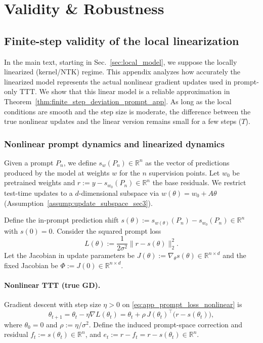 \documentclass{article}
\theoremstyle{plain}
\theoremstyle{definition}
\theoremstyle{remark}
\begin{document}
\section{Validity \& Robustness}

\subsection{Finite-step validity of the local linearization}
\label{app:linearization_error}

In the main text, starting in Sec.~\ref{sec:local_model}, we suppose the locally linearized (kernel/NTK) regime. This appendix analyzes how accurately the linearized model represents the actual nonlinear gradient updates used in prompt-only TTT. We show that this linear model is a reliable approximation in Theorem~\ref{thm:finite_step_deviation_prompt_app}. As long as the local conditions are smooth and the step size is moderate, the difference between the true nonlinear updates and the linear version remains small for a few steps ($T$).

\subsubsection{Nonlinear prompt dynamics and linearized dynamics}
\label{app:nonlinear_vs_linear}

Given a prompt $P_n$, we define $s_w(P_n) \in \mathbb{R}^n$ as the vector of predictions produced by the model at weights $w$ for the $n$ supervision points.
Let $w_0$ be pretrained weights and $r:=y-s_{w_0}(P_n)\in\mathbb{R}^n$ the base residuals. We restrict test-time updates to a $d$-dimensional subspace via $w(\theta)=w_0+A\theta$ (Assumption~\ref{assump:update_subspace_sec3}).

Define the in-prompt prediction shift $s(\theta) := s_{w(\theta)}(P_n)-s_{w_0}(P_n)\in\mathbb{R}^n$ with $s(0)=0$. Consider the squared prompt loss
\begin{equation} 
    L(\theta):=\frac{1}{2\sigma^2}\|r-s(\theta)\|_2^2.
    \label{eq:app_prompt_loss_nonlinear}
\end{equation}
Let the Jacobian in update parameters be $J(\theta):=\nabla_\theta s(\theta)\in\mathbb{R}^{n\times d}$ and the fixed Jacobian be $\Phi:=J(0)\in\mathbb{R}^{n\times d}$.


\paragraph{Nonlinear TTT (true GD).}
Gradient descent with step size $\eta>0$ on \eqref{eq:app_prompt_loss_nonlinear} is
\begin{equation}
    \theta_{t+1} 
    =\theta_t-\eta\nabla L(\theta_t) 
    =\theta_t+\rho\,J(\theta_t)^\top\bigl(r-s(\theta_t)\bigr),
\label{eq:app_true_gd}
\end{equation}
where $\theta_0=0$ and $\rho:=\eta/\sigma^2$.
Define the induced prompt-space correction and residual $f_t:=s(\theta_t)\in\mathbb{R}^n$, and $e_t:=r-f_t=r-s(\theta_t)\in\mathbb{R}^n$.
\end{document}
